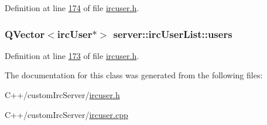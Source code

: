 Definition at line \hyperlink{custom_irc_server_2ircuser_8h_source_l00174}{174} of file \hyperlink{custom_irc_server_2ircuser_8h_source}{ircuser.\-h}.

\hypertarget{classserver_1_1irc_user_list_aed148b0d15f108c3e08d4705033aa2d3}{
\subsubsection[{users}]{\setlength{\rightskip}{0pt plus 5cm}Q\-Vector$<${\bf irc\-User}$\ast$$>$ server\-::irc\-User\-List\-::users\hspace{0.3cm}{\ttfamily [private]}}}\label{d4/d08/classserver_1_1irc_user_list_aed148b0d15f108c3e08d4705033aa2d3}


Definition at line \hyperlink{custom_irc_server_2ircuser_8h_source_l00173}{173} of file \hyperlink{custom_irc_server_2ircuser_8h_source}{ircuser.\-h}.



The documentation for this class was generated from the following files\-:\begin{DoxyCompactItemize}
\item 
C++/custom\-Irc\-Server/\hyperlink{custom_irc_server_2ircuser_8h}{ircuser.\-h}\item 
C++/custom\-Irc\-Server/\hyperlink{custom_irc_server_2ircuser_8cpp}{ircuser.\-cpp}\end{DoxyCompactItemize}
